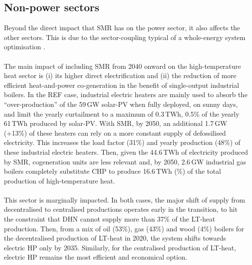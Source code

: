 \newpage
\subsection{Non-power sectors}
\label{subsec:atom_mol:results_deter_others}

Beyond the direct impact that \gls{SMR} has on the power sector, it also affects the other sectors. This is due to the sector-coupling typical of a whole-energy system optimisation \cite{contino2020whole}.\\

\\

The main impact of including \gls{SMR} from 2040 onward on the high-temperature heat sector is (i) its higher direct electrification and (ii) the reduction of more efficient heat-and-power co-generation in the benefit of single-output industrial boilers. In the REF case, industrial electric heaters are mainly used to absorb the ``over-production'' of the 59\,GW solar-PV when fully deployed, on sunny days, and limit the yearly curtailment to a maximum of 0.3\,TWh, 0.5\% of the yearly 61\,TWh produced by solar-PV. With \gls{SMR}, by 2050, an additional 1.7\,GW (+13\%) of these heaters can rely on a more constant supply of defossilised electricity. This increases the load factor (31\%) and yearly production (48\%) of these industrial electric heaters. Then, given the 44.6\,TWh of electricity produced by \gls{SMR}, cogeneration units are less relevant and, by 2050, 2.6\,GW industrial gas boilers completely substitute \gls{CHP} to produce 16.6\,TWh (\%) of the total production of high-temperature heat.\\

\\

This sector is marginally impacted. In both cases, the major shift of supply from decentralised to centralised productions operates early in the transition, to hit the constraint that \gls{DHN} cannot supply more than 37\% of the \gls{LT}-heat production. Then, from a mix of oil (53\%), gas (43\%) and wood (4\%) boilers for the decentralised production of \gls{LT}-heat in 2020, the system shifts towards electric \gls{HP} only by 2035. Similarly, for the centralised production of \gls{LT}-heat, electric \gls{HP} remains the most efficient and economical option.\\

\\

